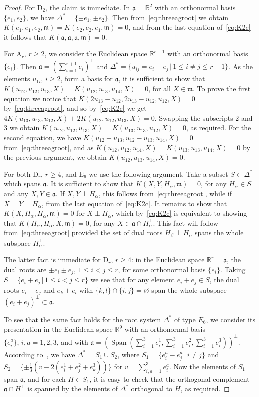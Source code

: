 \documentclass[12pt,reqno]{amsart}
\renewcommand \a{\alpha}
\newcommand \br{\mathbb{R}}
\newcommand \Span{\operatorname{Span}}
\newcommand\ag{\mathfrak a}
\newcommand\m{\mathfrak m}
\newcommand \<{\langle}
\renewcommand \>{\rangle}
\theoremstyle{definition}
\theoremstyle{remark}
\begin{document}
\begin{proof}
For $\mathrm{D}_2$, the claim is immediate. In $\ag = \br^2$ with an orthonormal basis $\{e_1,e_2\}$, we have $\Delta^* = \{\pm e_1, \pm e_2\}$. Then from~\eqref{eq:threeagroot} we obtain $K(e_1,e_1,e_2,\m) = K(e_2,e_2,e_1,\m) = 0$, and from the last equation of~\eqref{eq:K2c} it follows that $K(\ag,\ag,\ag,\m) = 0$.

For $\mathrm{A}_r, \, r \ge 2$, we consider the Euclidean space $\br^{r+1}$ with an orthonormal basis $\{e_i\}$. Then $\ag = (\sum_{i=1}^{r+1}e_i)^\perp$ and $\Delta^* = \{u_{ij} = e_i-e_j \, | \, 1 \le i \ne j \le r+1\}$. As the elements $u_{1i}, \, i \ge 2$, form a basis for $\ag$, it is sufficient to show that $K(u_{12},u_{12},u_{13},X) = K(u_{12},u_{13},u_{14},X)= 0$, for all $X \in \m$. To prove the first equation we notice that $K(2u_{13}-u_{12},2u_{13}-u_{12},u_{12},X) = 0$ by~\eqref{eq:threeagroot}, and so by~\eqref{eq:K2c} we get $4K(u_{13},u_{13},u_{12},X) + 2K(u_{12},u_{12},u_{13},X) = 0$. Swapping the subscripts $2$ and $3$ we obtain $K(u_{12},u_{12},u_{13},X) = K(u_{13},u_{13},u_{12},X) = 0$, as required. For the second equation, we have $K(u_{12}-u_{13}, u_{12}-u_{13}, u_{14},X) = 0$ from~\eqref{eq:threeagroot}, and as $K(u_{12}, u_{12}, u_{14},X) = K(u_{13}, u_{13}, u_{14},X) = 0$ by the previous argument, we obtain $K(u_{12},u_{13},u_{14},X)= 0$.

For both $\mathrm{D}_r, \, r \ge 4$, and $\mathrm{E}_6$ we use the following argument. Take a subset $S \subset \Delta^*$ which spans $\ag$. It is sufficient to show that $K(X,Y,H_\a,\m) = 0$, for any $H_\a \in S$ and any $X, Y \in \ag$. If $X, Y \perp H_\a$, this follows from~\eqref{eq:threeagroot}, while if $X=Y=H_\a$, from the last equation of~\eqref{eq:K2c}. It remains to show that $K(X,H_\a,H_\a,\m) = 0$ for $X \perp H_\a$, which by~\eqref{eq:K2c} is equivalent to showing that $K(H_\a,H_\a,X,\m) = 0$, for any $X  \in \ag \cap H_\a^\perp$. This fact will follow from~\eqref{eq:threeagroot} provided the set of dual roots $H_\beta \perp H_\a$ spans the whole subspace $H_\a^\perp$.

The latter fact is immediate for $\mathrm{D}_r, \, r \ge 4$: in the Euclidean space $\br^r = \ag$, the dual roots are $\pm e_i \pm e_j,\, 1 \le i < j \le r$, for some orthonormal basis $\{e_i\}$. Taking $S = \{e_i+e_j \, | \, 1 \le i < j \le r\}$ we see that for any element $e_i + e_j \in S$, the dual roots $e_i-e_j$ and $e_k \pm e_l$ with $\{k,l\} \cap \{i,j\} = \varnothing$ span the whole subspace $(e_i+e_j)^\perp \subset \ag$.

To see that the same fact holds for the root system $\Delta^*$ of type $E_6$, we consider its presentation in the Euclidean space $\br^9$ with an orthonormal basis $\{e_i^a\},\, i, a = 1,2,3$, and with $\ag = (\Span(\sum_{i=1}^{3}e_i^1, \sum_{i=1}^{3}e_i^2, \sum_{i=1}^{3}e_i^3))^\perp$. According to~\cite{VdJ}, we have $\Delta^* = S_1 \cup S_2$, where $S_1=\{e_i^a-e_j^a \,| \, i \ne j\}$ and $S_2=\{\pm \frac13 (v-2(e_i^1+e_j^2+e_k^3))\}$ for $v=\sum_{i,a=1}^{3}e_i^a$. Now the elements of $S_1$ span $\ag$, and for each $H \in S_1$, it is easy to check that the orthogonal complement $\ag \cap H^\perp$ is spanned by the elements of $\Delta^*$ orthogonal to $H$, as required.
	\end{proof}
	
\end{document}
